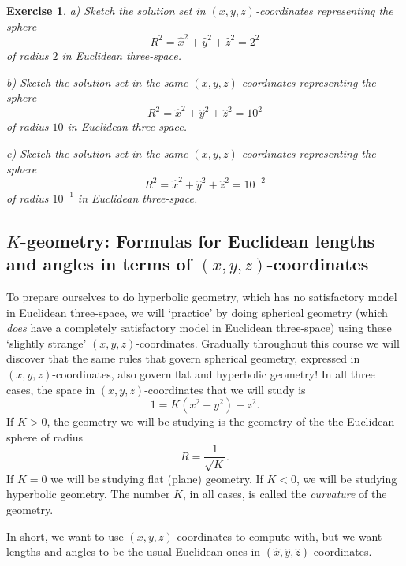 \documentclass{article}%
\newtheorem{exercise}[theorem]{Exercise}
\begin{document}
\begin{exercise}
a) Sketch the solution set in $\left(  x,y,z\right)  $-coordinates
representing the sphere%
\[
R^{2}=\hat{x}^{2}+\hat{y}^{2}+\hat{z}^{2}=2^{2}%
\]
of radius $2$ in Euclidean three-space.

b) Sketch the solution set in the same $\left(  x,y,z\right)  $-coordinates
representing the sphere%
\[
R^{2}=\hat{x}^{2}+\hat{y}^{2}+\hat{z}^{2}=10^{2}%
\]
of radius $10$ in Euclidean three-space.

c) Sketch the solution set in the same $\left(  x,y,z\right)  $-coordinates
representing the sphere%
\[
R^{2}=\hat{x}^{2}+\hat{y}^{2}+\hat{z}^{2}=10^{-2}%
\]
of radius $10^{-1}$ in Euclidean three-space.\pagebreak
\end{exercise}

\subsection{$K$-geometry: Formulas for Euclidean lengths and angles in terms
of $\left(  x,y,z\right)  $-coordinates}

To prepare ourselves to do hyperbolic geometry, which has no satisfactory
model in Euclidean three-space, we will `practice' by doing spherical geometry
(which \textit{does} have a completely satisfactory model in Euclidean
three-space) using these `slightly strange' $\left(  x,y,z\right)
$-coordinates. Gradually throughout this course we will discover that the same
rules that govern spherical geometry, expressed in $\left(  x,y,z\right)
$-coordinates, also govern flat and hyperbolic geometry! In all three cases,
the space in $\left(  x,y,z\right)  $-coordinates that we will study is%
\begin{equation}
1=K\left(  x^{2}+y^{2}\right)  +z^{2}. \label{11}%
\end{equation}
If $K>0$, the geometry we will be studying is the geometry of the the
Euclidean sphere of radius%
\[
R=\frac{1}{\sqrt{K}}.
\]
If $K=0$ we will be studying flat (plane) geometry. If $K<0$, we will be
studying hyperbolic geometry. The number $K$, in all cases, is called the
\textit{curvature} of the geometry.

In short, we want to use $\left(  x,y,z\right)  $-coordinates to compute with,
but we want lengths and angles to be the usual Euclidean ones in $\left(
\hat{x},\hat{y},\hat{z}\right)  $-coordinates.
\end{document}
